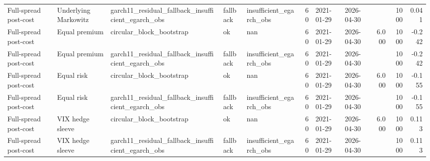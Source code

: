 \begin{tabular}{lllllrllrrr}
Full-spread post-cost & Underlying Markowitz & garch11\_residual\_fallback\_insufficient\_egarch\_obs & fallback & insufficient\_egarch\_obs & 60 & 2021-01-29 & 2026-04-30 &  & 1000 & 0.041 \\
Full-spread post-cost & Equal premium & circular\_block\_bootstrap & ok & nan & 60 & 2021-01-29 & 2026-04-30 & 6.000 & 1000 & -0.242 \\
Full-spread post-cost & Equal premium & garch11\_residual\_fallback\_insufficient\_egarch\_obs & fallback & insufficient\_egarch\_obs & 60 & 2021-01-29 & 2026-04-30 &  & 1000 & -0.242 \\
Full-spread post-cost & Equal risk & circular\_block\_bootstrap & ok & nan & 60 & 2021-01-29 & 2026-04-30 & 6.000 & 1000 & -0.155 \\
Full-spread post-cost & Equal risk & garch11\_residual\_fallback\_insufficient\_egarch\_obs & fallback & insufficient\_egarch\_obs & 60 & 2021-01-29 & 2026-04-30 &  & 1000 & -0.155 \\
Full-spread post-cost & VIX hedge sleeve & circular\_block\_bootstrap & ok & nan & 60 & 2021-01-29 & 2026-04-30 & 6.000 & 1000 & 0.113 \\
Full-spread post-cost & VIX hedge sleeve & garch11\_residual\_fallback\_insufficient\_egarch\_obs & fallback & insufficient\_egarch\_obs & 60 & 2021-01-29 & 2026-04-30 &  & 1000 & 0.113 \\
\bottomrule
\end{tabular}
